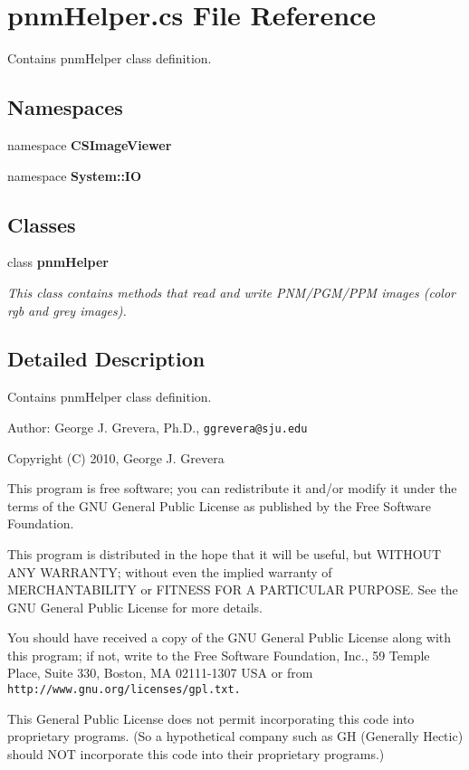 \section{pnm\-Helper.cs File Reference}
\label{pnm_helper_8cs}
Contains pnm\-Helper class definition. 

\subsection*{Namespaces}
\begin{CompactItemize}
\item 
namespace {\bf CSImage\-Viewer}
\item 
namespace {\bf System::IO}
\end{CompactItemize}
\subsection*{Classes}
\begin{CompactItemize}
\item 
class {\bf pnm\-Helper}
\begin{CompactList}\small\item\em This class contains methods that read and write PNM/PGM/PPM images (color rgb and grey images). \item\end{CompactList}\end{CompactItemize}


\subsection{Detailed Description}
Contains pnm\-Helper class definition. 

\begin{Desc}
\item[Author:]George J. Grevera, Ph.D., {\tt ggrevera@sju.edu}\end{Desc}
Copyright (C) 2010, George J. Grevera

This program is free software; you can redistribute it and/or modify it under the terms of the GNU General Public License as published by the Free Software Foundation.

This program is distributed in the hope that it will be useful, but WITHOUT ANY WARRANTY; without even the implied warranty of MERCHANTABILITY or FITNESS FOR A PARTICULAR PURPOSE. See the GNU General Public License for more details.

You should have received a copy of the GNU General Public License along with this program; if not, write to the Free Software Foundation, Inc., 59 Temple Place, Suite 330, Boston, MA 02111-1307 USA or from {\tt http://www.gnu.org/licenses/gpl.txt.}

This General Public License does not permit incorporating this code into proprietary programs. (So a hypothetical company such as GH (Generally Hectic) should NOT incorporate this code into their proprietary programs.) 